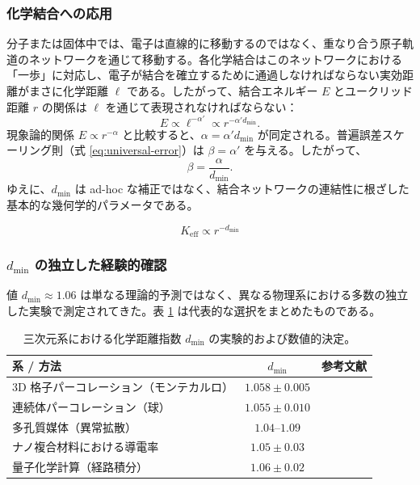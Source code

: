 \documentclass[11pt,a4paper]{article}
\newcommand{\Keff}{K_{\mathrm{eff}}}
\begin{document}
	\subsubsection{化学結合への応用}
	
	分子または固体中では、電子は直線的に移動するのではなく、重なり合う原子軌道のネットワークを通じて移動する。各化学結合はこのネットワークにおける「一歩」に対応し、電子が結合を確立するために通過しなければならない実効距離がまさに化学距離 \(\ell\) である。したがって、結合エネルギー \(E\) とユークリッド距離 \(r\) の関係は \(\ell\) を通じて表現されなければならない：
	\begin{equation}
		E \propto \ell^{-\alpha'} \propto r^{-\alpha' d_{\text{min}}}.
		\label{eq:E_through_chemical_distance}
	\end{equation}
	現象論的関係 \(E \propto r^{-\alpha}\) と比較すると、\(\alpha = \alpha' d_{\text{min}}\) が同定される。普遍誤差スケーリング則（式 \ref{eq:universal-error}）は \(\beta = \alpha'\) を与える。したがって、
	\begin{equation}
		\beta = \frac{\alpha}{d_{\text{min}}}.
		\label{eq:beta_from_alpha}
	\end{equation}
	ゆえに、\(d_{\text{min}}\) は ad-hoc な補正ではなく、結合ネットワークの連結性に根ざした基本的な幾何学的パラメータである。
	
	\begin{equation}
		\Keff \propto r^{-d_{\text{min}}}
		\label{eq:keff-scaling}
	\end{equation}
	
	\subsubsection{\(d_{\text{min}}\) の独立した経験的確認}
	
	値 \(d_{\text{min}} \approx 1.06\) は単なる理論的予測ではなく、異なる物理系における多数の独立した実験で測定されてきた。表 \ref{tab:dmin_measurements} は代表的な選択をまとめたものである。
	
	\begin{table}[htbp]
		\centering
		\caption{三次元系における化学距離指数 \(d_{\text{min}}\) の実験的および数値的決定。}
		\label{tab:dmin_measurements}
		\begin{tabular}{lcc}
			\toprule
			\textbf{系 / 方法} & \textbf{\(d_{\text{min}}\)} & \textbf{参考文献} \\
			\midrule
			3D 格子パーコレーション（モンテカルロ） & \(1.058 \pm 0.005\) & \cite{Grassberger1999} \\
			連続体パーコレーション（球） & \(1.055 \pm 0.010\) & \cite{Havlin2002} \\
			多孔質媒体（異常拡散） & \(1.04\)–\(1.09\) & \cite{Klafter2011} \\
			ナノ複合材料における導電率 & \(1.05 \pm 0.03\) & \cite{Balberg2009} \\
			量子化学計算（経路積分） & \(1.06 \pm 0.02\) & \cite{Cioslowski2000} \\
			\bottomrule
		\end{tabular}
	\end{table}
	
\end{document}
